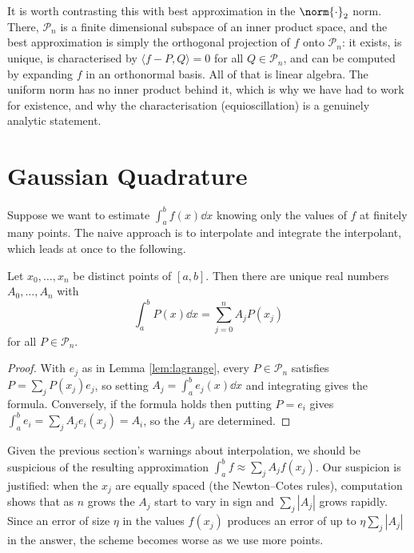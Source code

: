 \documentclass[a4paper]{scrartcl}
\newcommand{\Pn}{\mathcal{P}}
\begin{document}
\begin{remark}
	It is worth contrasting this with best approximation in the $\norm{\cdot}_2$ norm. There, $\Pn_n$ is a finite dimensional subspace of an inner product space, and the best approximation is simply the orthogonal projection of $f$ onto $\Pn_n$: it exists, is unique, is characterised by $\langle f - P, Q\rangle = 0$ for all $Q\in\Pn_n$, and can be computed by expanding $f$ in an orthonormal basis. All of that is linear algebra. The uniform norm has no inner product behind it, which is why we have had to work for existence, and why the characterisation (equioscillation) is a genuinely analytic statement.
\end{remark}

\section{Gaussian Quadrature}

Suppose we want to estimate $\int_a^b f(x)\dd x$ knowing only the values of $f$ at finitely many points. The naive approach is to interpolate and integrate the interpolant, which leads at once to the following.

\begin{lemma}\label{lem:quad-weights}
	Let $x_0,\ldots,x_n$ be distinct points of $[a,b]$. Then there are unique real numbers $A_0,\ldots,A_n$ with
	$$\int_a^b P(x)\dd x = \sum_{j=0}^n A_jP(x_j)$$
	for all $P \in\Pn_n$.
\end{lemma}

\begin{proof}
	With $e_j$ as in Lemma \ref{lem:lagrange}, every $P\in\Pn_n$ satisfies $P = \sum_j P(x_j)e_j$, so setting $A_j = \int_a^b e_j(x)\dd x$ and integrating gives the formula. Conversely, if the formula holds then putting $P = e_i$ gives $\int_a^b e_i = \sum_j A_j e_i(x_j) = A_i$, so the $A_j$ are determined.
\end{proof}

Given the previous section's warnings about interpolation, we should be suspicious of the resulting approximation $\int_a^b f \approx \sum_j A_jf(x_j)$. Our suspicion is justified: when the $x_j$ are equally spaced (the Newton--Cotes rules), computation shows that as $n$ grows the $A_j$ start to vary in sign and $\sum_j|A_j|$ grows rapidly. Since an error of size $\eta$ in the values $f(x_j)$ produces an error of up to $\eta\sum_j|A_j|$ in the answer, the scheme becomes worse as we use more points.
\end{document}
